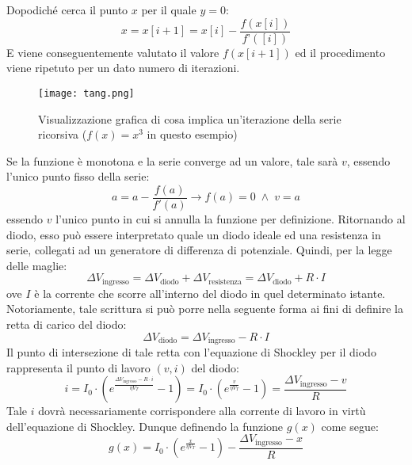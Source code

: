 \documentclass{article}[a4paper, oneside, 11pt]
\begin{document}
Dopodich\'e cerca il punto $x$ per il quale $y = 0$:
\begin{equation}
x = x[i+1] = x[i] - \frac{f(x[i])}{f’([i])}
\end{equation}
E viene conseguentemente valutato il valore $f(x[i+1])$ ed il procedimento viene 
ripetuto per un dato numero di iterazioni. 
\begin{figure}[!htbp]
	\centering 
 		\texttt{[image: tang.png]}
	\caption{Visualizzazione grafica di cosa implica un’iterazione della 
	serie ricorsiva ($f(x) = x^3$ in questo esempio)\label{fig: tang}}
\end{figure}
Se la funzione \`e monotona e la serie converge ad un valore, tale sar\`a $v$, 
essendo l’unico punto fisso della serie:
\begin{equation}
 a = a -  \frac{f(a)}{f'(a)} \to f(a) = 0 \; \land \; v = a
\end{equation}
essendo $v$ l’unico punto in cui si annulla la funzione per definizione.
Ritornando al diodo, esso pu\`o essere interpretato quale un diodo ideale ed una 
resistenza in serie, collegati ad un generatore di differenza di potenziale. 
Quindi, per la legge delle maglie:
\begin{equation}
\Delta V_{\text{ingresso}} = \Delta V_{\text{diodo}} + \Delta 
V_{\text{resistenza}} = \Delta V_{\text{diodo}} + R \cdot I
\end{equation}
ove $I$ \`e la corrente che scorre all’interno del diodo in quel determinato 
istante. Notoriamente, tale scrittura si pu\`o porre nella seguente forma ai 
fini di definire la retta di carico del diodo:
\begin{equation}
\Delta V_{\text{diodo}} = \Delta V_{\text{ingresso}} - R \cdot I
\end{equation}
Il punto di intersezione di tale retta con l’equazione di Shockley per il 
diodo rappresenta il punto di lavoro $(v, i)$ del diodo:
\begin{equation}
i = I_0 \cdot ( e^{\frac {\Delta V_{\text{ingresso}} - R \cdot i}{\eta V_T} } - 
1) = I_0 \cdot (e^{\frac{v} {\eta V_T}} -1) =  \frac{\Delta V_{\text{ingresso}} 
- v}{R}
\end{equation}
Tale $i$ dovr\`a necessariamente corrispondere alla corrente di lavoro in
virt\`u dell’equazione di Shockley. Dunque definendo la funzione $g(x)$
come segue:
\begin{equation}\label{eq: invsck}
g(x) = I_0 \cdot ( e^{\frac{x}{\eta V_T}} - 1)  - \frac {\Delta 
V_{\text{ingresso}} - x}{R}
\end{equation}
\end{document}
